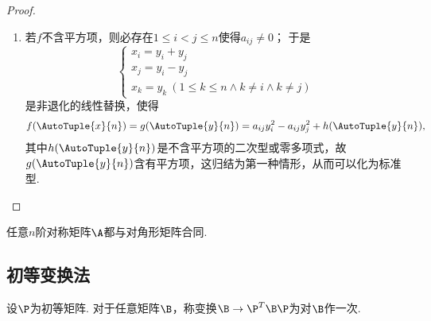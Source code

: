 \begin{theorem}
\begin{proof}
\begin{enumerate}
\item 若\(f\)不含平方项，则必存在\(1 \leqslant i < j \leqslant n\)使得\(a_{ij}\neq0\)；
于是\[
\left\{ \begin{array}{l}
x_i = y_i + y_j \\
x_j = y_i - y_j \\
x_k = y_k\ (1 \leqslant k \leqslant n \land k \neq i \land k \neq j)
\end{array} \right.
\]是非退化的线性替换，使得\[
f(\AutoTuple{x}{n})
= g(\AutoTuple{y}{n})
= a_{ij} y_i^2 - a_{ij} y_j^2 + h(\AutoTuple{y}{n}),
\]其中\(h(\AutoTuple{y}{n})\)是不含平方项的二次型或零多项式，故\(g(\AutoTuple{y}{n})\)含有平方项，这归结为第一种情形，从而可以化为标准型.
\qedhere
\end{enumerate}
\end{proof}
\end{theorem}

\begin{corollary}
任意\(n\)阶对称矩阵\(\A\)都与对角形矩阵合同.
\end{corollary}

\subsection{初等变换法}
\begin{definition}
设\(\P\)为初等矩阵.
对于任意矩阵\(\B\)，称变换\(\B \to \P^T\B\P\)为对\(\B\)作一次.
\end{definition}

